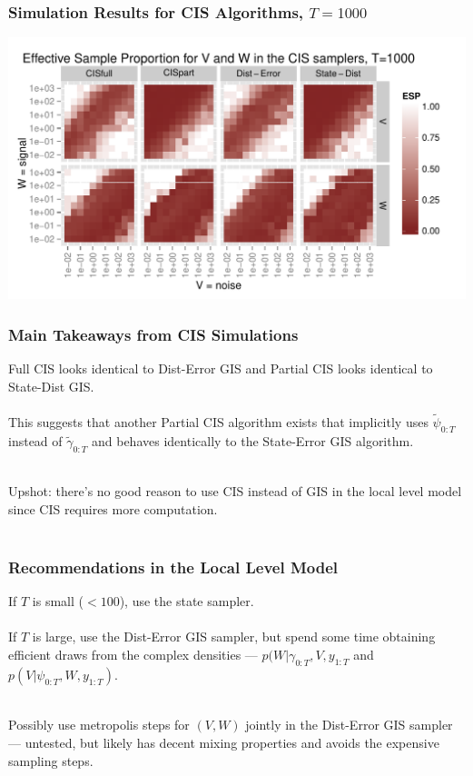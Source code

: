 \documentclass[xcolor=dvipsnames]{beamer}\usepackage{graphicx, color}
\newenvironment{knitrout}{}{} %
\begin{document}
\begin{frame}
\frametitle{Simulation Results for CIS Algorithms, $T=1000$}

\begin{knitrout}\footnotesize
{}\color{fgcolor}
\includegraphics[width=1\textwidth]{figure/cisESplotT1000} 

\end{knitrout}


\end{frame}
 
\begin{frame}
   \frametitle{Main Takeaways from CIS Simulations}
   Full CIS looks identical to Dist-Error GIS and Partial CIS looks identical to State-Dist GIS.\\~\\
   
   This suggests that another Partial CIS algorithm exists that implicitly uses $\tilde{\psi}_{0:T}$ instead of $\tilde{\gamma}_{0:T}$ and behaves identically to the State-Error GIS algorithm.\\~\\
   \pause
   
   Upshot: there's no good reason to use CIS instead of GIS in the local level model since CIS requires more computation.\\~\\
\end{frame}

\begin{frame}
\frametitle{Recommendations in the Local Level Model}
If $T$ is small ($<100$), use the state sampler.\\~\\

If $T$ is large, use the Dist-Error GIS sampler, but spend some time obtaining efficient draws from the complex densities --- $p(W|\gamma_{0:T},V,y_{1:T}$ and $p(V|\psi_{0:T},W,y_{1:T})$.\\~\\
\pause

Possibly use metropolis steps for $(V,W)$ jointly in the Dist-Error GIS sampler --- untested, but likely has decent mixing properties and avoids the expensive sampling steps.
\end{frame}
\end{document}
